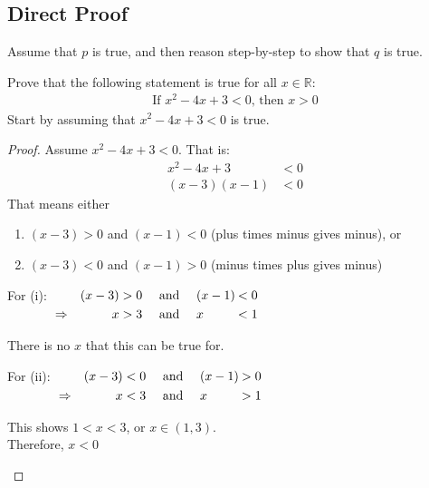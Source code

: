 \documentclass[\main/notes.tex]{subfiles}
\begin{document}
			\subsection{Direct Proof}
				Assume that $p$ is true, and then reason step-by-step to show that $q$ is true.
				\begin{example}
					Prove that the following statement is true for all $x \in \mathbb{R}$:
					\begin{align*}
						\text{If } x^{2} - 4x + 3 < 0 \text{, then } x > 0
					\end{align*}
					Start by assuming that $x^{2} - 4x + 3 < 0$ is true.
					\begin{proof}
						Assume $x^{2} - 4x + 3 < 0$. That is:
						\begin{align*}
							x^{2} - 4x + 3 &< 0\\
							(x - 3)(x - 1) &< 0 \tag*{(by factorisation)}
						\end{align*}
						That means either 
							\begin{enumerate}[label=(\roman*)]
								\item $(x - 3) > 0$ and $(x - 1) < 0$ (plus times minus gives minus), or
								\item $(x - 3) < 0$ and $(x - 1) > 0$ (minus times plus gives minus)
							\end{enumerate}
						For (i):
						$ \begin{alignedat}[t]{3}
								& & (x - 3) &> 0 \quad \text{ and }\quad  (x - 1) \: &< 0\\
								& \Rightarrow \quad & x &> 3 \quad \text{ and } \quad x &< 1
							\end{alignedat} $
						\begin{indentparagraph}
							There is no $x$ that this can be true for.
						\end{indentparagraph}
						For (ii):
						$ \begin{alignedat}[t]{3}
								& & (x - 3) &< 0 \quad \text{ and }\quad  (x - 1) \: &> 0\\
								& \Rightarrow \quad & x &< 3 \quad \text{ and } \quad x &> 1
						\end{alignedat} $
							\begin{indentparagraph}
								This shows $1 < x < 3$, or $x \in (1, 3)$.\\
								Therefore, $x < 0$
							\end{indentparagraph}
					\end{proof}
				\end{example}
			\pagebreak
\end{document}
